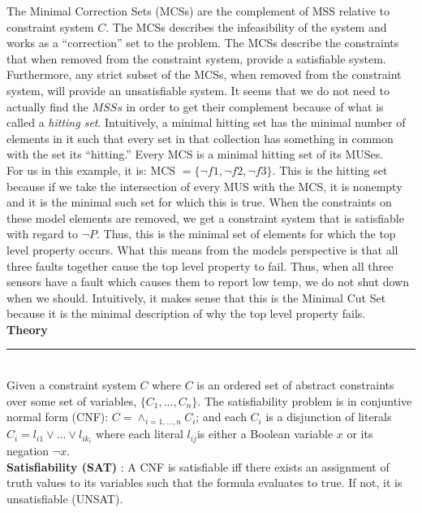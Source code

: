 The Minimal Correction Sets (MCSs) are the complement of MSS relative to constraint system $C$. The MCSs describes the infeasibility of the system and works as a ``correction'' set to the problem. The MCSs describe the constraints that when removed from the constraint system, provide a satisfiable system. Furthermore, any strict subset of the MCSs, when removed from the constraint system, will provide an unsatisfiable system. It seems that we do not need to actually find the $MSSs$ in order to get their complement because of what is called a \textit{hitting set}. Intuitively, a minimal hitting set has the minimal number of elements in it such that every set in that collection has something in common with the set its ``hitting.'' Every MCS is a minimal hitting set of its MUSes.\\

For us in this example, it is: MCS $ = \{\neg f1, \neg f2, \neg f3\}$. This is the hitting set because if we take the intersection of every MUS with the MCS, it is nonempty and it is the minimal such set for which this is true. When the constraints on these model elements are removed, we get a constraint system that is satisfiable with regard to $\neg P$. Thus, this is the minimal set of elements for which the top level property occurs. What this means from the models perspective is that all three faults together cause the top level property to fail. Thus, when all three sensors have a fault which causes them to report low temp, we do not shut down when we should. Intuitively, it makes sense that this is the Minimal Cut Set because it is the minimal description of why the top level property fails. \\


\textbf{Theory}\\
\noindent\rule{10cm}{0.4pt}\\
Given a constraint system $C$ where $C$ is an ordered set of abstract constraints over some set of variables, $\{C_1, ..., C_n\}$. The satisfiability problem is in conjuntive normal form (CNF): $C = \land_{i=1,...,n} C_i$; and each $C_i$ is a disjunction of literals $C_i = l_{i1} \lor ... \lor l_{ik_i}$ where each literal $ l_{ij}$is either a Boolean variable $x$ or its negation $\neg x$. \\

\textbf{Satisfiability (SAT)} : A CNF is satisfiable iff there exists an assignment of truth values to its variables such that the formula evaluates to true. If not, it is unsatisfiable (UNSAT). \\

